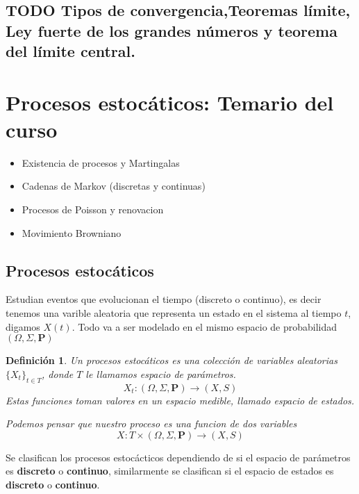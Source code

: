 \documentclass[letterpaper]{article}
\newtheorem{def.}{Definici\'on}[section]
\begin{document}
\subsection{{\bfseries\sffamily TODO} Tipos de convergencia,Teoremas límite, Ley fuerte de los grandes números y teorema del límite central.}
\label{sec:orgf8e4ba0}

\section{Procesos estocáticos: Temario del curso}
\label{sec:org321a3e0}

\begin{itemize}
\item Existencia de procesos y Martingalas
\item Cadenas de Markov (discretas y continuas)
\item Procesos de Poisson y renovacion
\item Movimiento Browniano
\end{itemize}

\subsection{Procesos estocáticos}
\label{sec:orgc913e4e}
Estudian eventos que evolucionan el tiempo (discreto o continuo), es decir tenemos una varible aleatoria que representa un estado en el sistema al tiempo \(t\), digamos \(X(t)\). Todo va a ser modelado en el mismo espacio de probabilidad \((\Omega,\Sigma,\textbf{P})\)
\begin{def.}
Un procesos estocáticos es una colección de variables aleatorias \(\{X_{t}\}_{t\in T}\), donde \(T\) le llamamos \emph{espacio de parámetros}.
\[
    X_{t}:(\Omega,\Sigma,\textbf{P})\rightarrow(X,S)
\]
Estas funciones toman valores en un espacio medible, llamado \emph{espacio de estados}.

Podemos pensar que nuestro proceso es una funcion de dos variables
\[
    X:T\times(\Omega,\Sigma,\textbf{P})\rightarrow(X,S)
\]
\end{def.}
Se clasifican los procesos estocácticos dependiendo de si el espacio de parámetros es \textbf{discreto} o \textbf{continuo}, similarmente se clasifican si el espacio de estados es \textbf{discreto} o \textbf{continuo}.
\end{document}
